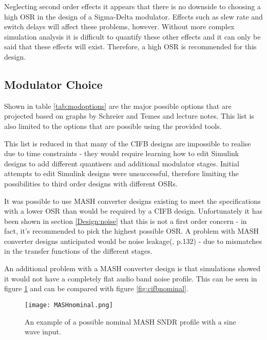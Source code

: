 

Neglecting second order effects it appears that there is no downside to choosing a high OSR in the design of a Sigma-Delta modulator.
Effects such as slew rate and switch delays will affect these problems, however.
Without more complex simulation analysis it is difficult to quantify these other effects and it can only be said that these effects will exist.
Therefore, a high OSR is recommended for this design.

\subsection{Modulator Choice}
Shown in table \ref{tab:modoptions} are the major possible options that are projected based on graphs by Schreier and Temes and lecture notes.
This list is also limited to the options that are possible using the provided tools.



This list is reduced in that many of the CIFB designs are impossible to realise due to time constraints - they would require learning how to edit Simulink designs to add different quantisers and additional modulator stages.
Initial attempts to edit Simulink designs were unsuccessful, therefore limiting the possibilities to third order designs with different OSRs.

It was possible to use MASH converter designs existing to meet the specifications with a lower OSR than would be required by a CIFB design.
Unfortunately it has been shown in section \ref{Design:noise} that this is not a first order concern - in fact, it's recommended to pick the highest possible OSR.
A problem with MASH converter designs anticipated would be noise leakage(\cite{Schreier2004}, p.132) - due to mismatches in the transfer functions of the different stages.

An additional problem with a MASH converter design is that simulations showed it would not have a completely flat audio band noise profile.
This can be seen in figure \ref{fig:MASHnominal} and can be compared with figure \ref{fig:cifbnominal}.

\begin{figure}
    \begin{center}
    \texttt{[image: MASHnominal.png]}
    \label{fig:MASHnominal}
    \caption{An example of a possible nominal MASH SNDR profile with a sine wave input.}
    \end{center}
\end{figure}

